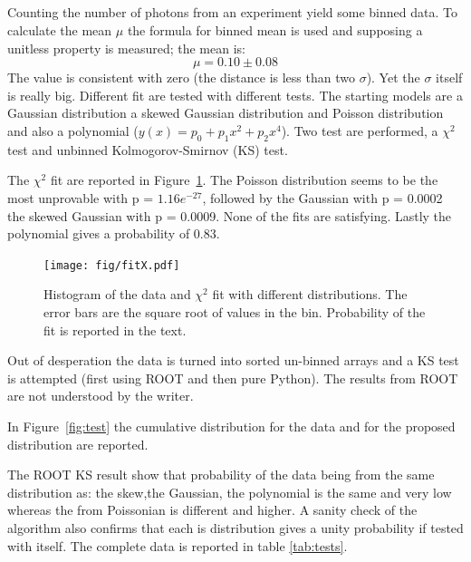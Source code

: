 \documentclass[twocolumn]{article}
\begin{document}
\subsection{}
	Counting the number of photons from an experiment yield some binned data.
	To calculate the mean $\mu$ the formula for binned mean is used and supposing  a unitless property is measured; the mean is:
	\begin{equation}
		 \mu = 0.10 \pm 0.08
	\end{equation}
	The value is consistent with zero (the distance is less than two  $\sigma$). Yet the $\sigma$ itself is really big.
	Different fit are tested with different tests. The starting models are a Gaussian distribution a skewed Gaussian distribution and Poisson distribution and also a polynomial ($y(x) =p_0 + p_1 x^2 + p_2x^4 $).
	Two test are performed, a $\chi ^2 $ test and  unbinned Kolmogorov-Smirnov (KS) test.

	The $\chi ^2 $ fit are reported in Figure~\ref{fig:fitX}. The Poisson distribution seems to be the most unprovable  with p = $1.16e^{-27}$, followed by the Gaussian with p = 0.0002 the skewed Gaussian with p = 0.0009. None of the fits are satisfying.
	Lastly the polynomial gives a probability of 0.83.
	\begin{figure}[h!]
		\begin{center}
			\texttt{[image: fig/fitX.pdf]}
		\end{center}
		\caption{Histogram of the data and $\chi ^2 $ fit with different distributions. The error bars are the square root of values in the bin. Probability of the fit is reported in the text.}
		\label{fig:fitX}
	\end{figure}

	Out of desperation the data is turned into sorted un-binned arrays and a KS test is attempted (first using ROOT and then pure Python).
	The results from ROOT are not understood by the writer.

	In Figure~\ref{fig:test} the cumulative distribution for the data and for the proposed distribution are reported.

	The  ROOT KS result show that probability of the data  being from the same distribution as: the skew,the Gaussian, the polynomial is the same and very low whereas the  from Poissonian is different and higher.
	A sanity check of the algorithm also confirms that each is distribution gives a unity probability if tested with itself.
	The complete data is reported in table \ref{tab:tests}.
\end{document}
